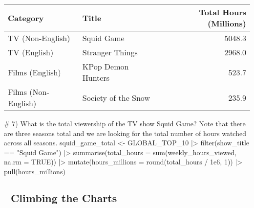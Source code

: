 \documentclass[
  12pt,
  letterpaper,
  DIV=11,
  numbers=noendperiod]{scrartcl}
\newenvironment{Shaded}{\begin{snugshade}}{\end{snugshade}}
\newcommand{\AttributeTok}[1]{\textcolor[rgb]{0.40,0.45,0.13}{#1}}
\newcommand{\CommentTok}[1]{\textcolor[rgb]{0.37,0.37,0.37}{#1}}
\newcommand{\ConstantTok}[1]{\textcolor[rgb]{0.56,0.35,0.01}{#1}}
\newcommand{\DecValTok}[1]{\textcolor[rgb]{0.68,0.00,0.00}{#1}}
\newcommand{\FloatTok}[1]{\textcolor[rgb]{0.68,0.00,0.00}{#1}}
\newcommand{\FunctionTok}[1]{\textcolor[rgb]{0.28,0.35,0.67}{#1}}
\newcommand{\NormalTok}[1]{\textcolor[rgb]{0.00,0.23,0.31}{#1}}
\newcommand{\OtherTok}[1]{\textcolor[rgb]{0.00,0.23,0.31}{#1}}
\newcommand{\SpecialCharTok}[1]{\textcolor[rgb]{0.37,0.37,0.37}{#1}}
\newcommand{\StringTok}[1]{\textcolor[rgb]{0.13,0.47,0.30}{#1}}
\begin{document}
\begin{longtable}[]{@{}llr@{}}
\toprule\noalign{}
Category & Title & Total Hours (Millions) \\
\midrule\noalign{}
\endhead
\bottomrule\noalign{}
\endlastfoot
TV (Non-English) & Squid Game & 5048.3 \\
TV (English) & Stranger Things & 2968.0 \\
Films (English) & KPop Demon Hunters & 523.7 \\
Films (Non-English) & Society of the Snow & 235.9 \\
\end{longtable}

\begin{Shaded}
\begin{Highlighting}[]
\CommentTok{\# 7) What is the total viewership of the TV show Squid Game? Note that there are three seasons total and we are looking for the total number of hours watched across all seasons.}
\NormalTok{squid\_game\_total }\OtherTok{\textless{}{-}}\NormalTok{ GLOBAL\_TOP\_10 }\SpecialCharTok{|\textgreater{}} 
  \FunctionTok{filter}\NormalTok{(show\_title }\SpecialCharTok{==} \StringTok{"Squid Game"}\NormalTok{) }\SpecialCharTok{|\textgreater{}}
  \FunctionTok{summarise}\NormalTok{(}\AttributeTok{total\_hours =} \FunctionTok{sum}\NormalTok{(weekly\_hours\_viewed, }\AttributeTok{na.rm =} \ConstantTok{TRUE}\NormalTok{)) }\SpecialCharTok{|\textgreater{}}
  \FunctionTok{mutate}\NormalTok{(}\AttributeTok{hours\_millions =} \FunctionTok{round}\NormalTok{(total\_hours }\SpecialCharTok{/} \FloatTok{1e6}\NormalTok{, }\DecValTok{1}\NormalTok{)) }\SpecialCharTok{|\textgreater{}}
  \FunctionTok{pull}\NormalTok{(hours\_millions)}
\end{Highlighting}
\end{Shaded}

\subsection{🚀 Climbing the Charts}\label{climbing-the-charts}
\end{document}
